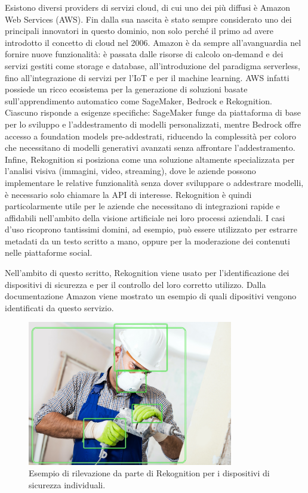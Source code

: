 \noindent Esistono diversi providers di servizi cloud, di cui uno dei più diffusi è Amazon Web Services (AWS). Fin dalla sua nascita è stato sempre considerato uno dei principali innovatori in questo dominio, non solo perché il primo ad avere introdotto il concetto di cloud nel 2006. Amazon è da sempre all'avanguardia nel fornire nuove funzionalità: è passata dalle risorse di calcolo on-demand e dei servizi gestiti come storage e database, all'introduzione del paradigma serverless, fino all'integrazione di servizi per l'IoT e per il machine learning. AWS infatti possiede un ricco ecosistema per la generazione di soluzioni basate sull'apprendimento automatico come SageMaker, Bedrock e Rekognition. Ciascuno risponde a esigenze specifiche: SageMaker funge da piattaforma di base per lo sviluppo e l'addestramento di modelli personalizzati, mentre Bedrock offre accesso a foundation models pre-addestrati, riducendo la complessità per coloro che necessitano di modelli generativi avanzati senza affrontare l’addestramento. Infine, Rekognition si posiziona come una soluzione altamente specializzata per l’analisi visiva (immagini, video, streaming), dove le aziende possono implementare le relative funzionalità senza dover sviluppare o addestrare modelli, è necessario solo chiamare la API di interesse. Rekognition è quindi particolarmente utile per le aziende che necessitano di integrazioni rapide e affidabili nell'ambito della visione artificiale nei loro processi aziendali. I casi d'uso ricoprono tantissimi domini, ad esempio, può essere utilizzato per estrarre metadati da un testo scritto a mano, oppure per la moderazione dei contenuti nelle piattaforme social.

\noindent Nell'ambito di questo scritto, Rekognition viene usato per l'identificazione dei dispositivi di sicurezza e per il controllo del loro corretto utilizzo. Dalla documentazione Amazon viene mostrato un esempio di quali dipositivi vengono identificati da questo servizio.

\begin{figure}[htbp]
    \centering
    \includegraphics[width=0.8\textwidth]{figures/worker-with-bb.png}
    \caption{Esempio di rilevazione da parte di Rekognition per i dispositivi di sicurezza individuali.}
    \label{fig:ppe-example}
\end{figure}

